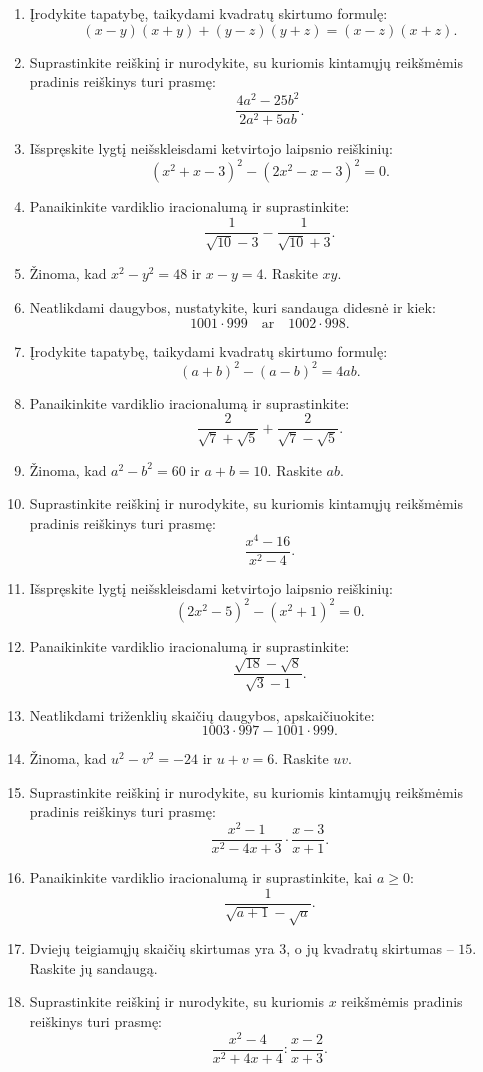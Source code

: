 \documentclass[11pt,a4paper]{article}
\begin{document}
\begin{enumerate}
\item Įrodykite tapatybę, taikydami kvadratų skirtumo formulę:\[(x-y)(x+y)+(y-z)(y+z)=(x-z)(x+z).\]
\item Suprastinkite reiškinį ir nurodykite, su kuriomis kintamųjų reikšmėmis pradinis reiškinys turi prasmę:\[\frac{4a^2-25b^2}{2a^2+5ab}.\]
\item Išspręskite lygtį neišskleisdami ketvirtojo laipsnio reiškinių:\[(x^2+x-3)^2-(2x^2-x-3)^2=0.\]
\item Panaikinkite vardiklio iracionalumą ir suprastinkite:\[\frac1{\sqrt{10}-3}-\frac1{\sqrt{10}+3}.\]
\item Žinoma, kad \(x^2-y^2=48\) ir \(x-y=4\). Raskite \(xy\).
\item Neatlikdami daugybos, nustatykite, kuri sandauga didesnė ir kiek:\[1001\cdot999\quad\text{ar}\quad1002\cdot998.\]
\item Įrodykite tapatybę, taikydami kvadratų skirtumo formulę:\[(a+b)^2-(a-b)^2=4ab.\]
\item Panaikinkite vardiklio iracionalumą ir suprastinkite:\[\frac2{\sqrt7+\sqrt5}+\frac2{\sqrt7-\sqrt5}.\]
\item Žinoma, kad \(a^2-b^2=60\) ir \(a+b=10\). Raskite \(ab\).
\item Suprastinkite reiškinį ir nurodykite, su kuriomis kintamųjų reikšmėmis pradinis reiškinys turi prasmę:\[\frac{x^4-16}{x^2-4}.\]
\item Išspręskite lygtį neišskleisdami ketvirtojo laipsnio reiškinių:\[(2x^2-5)^2-(x^2+1)^2=0.\]
\item Panaikinkite vardiklio iracionalumą ir suprastinkite:\[\frac{\sqrt{18}-\sqrt8}{\sqrt3-1}.\]
\item Neatlikdami triženklių skaičių daugybos, apskaičiuokite:\[1003\cdot997-1001\cdot999.\]
\item Žinoma, kad \(u^2-v^2=-24\) ir \(u+v=6\). Raskite \(uv\).
\item Suprastinkite reiškinį ir nurodykite, su kuriomis kintamųjų reikšmėmis pradinis reiškinys turi prasmę:\[\frac{x^2-1}{x^2-4x+3}\cdot\frac{x-3}{x+1}.\]
\item Panaikinkite vardiklio iracionalumą ir suprastinkite, kai \(a\ge0\):\[\frac1{\sqrt{a+1}-\sqrt a}.\]
\item Dviejų teigiamųjų skaičių skirtumas yra \(3\), o jų kvadratų skirtumas -- \(15\). Raskite jų sandaugą.
\item Suprastinkite reiškinį ir nurodykite, su kuriomis \(x\) reikšmėmis pradinis reiškinys turi prasmę:\[\frac{x^2-4}{x^2+4x+4}:\frac{x-2}{x+3}.\]

\end{enumerate}
\end{document}
